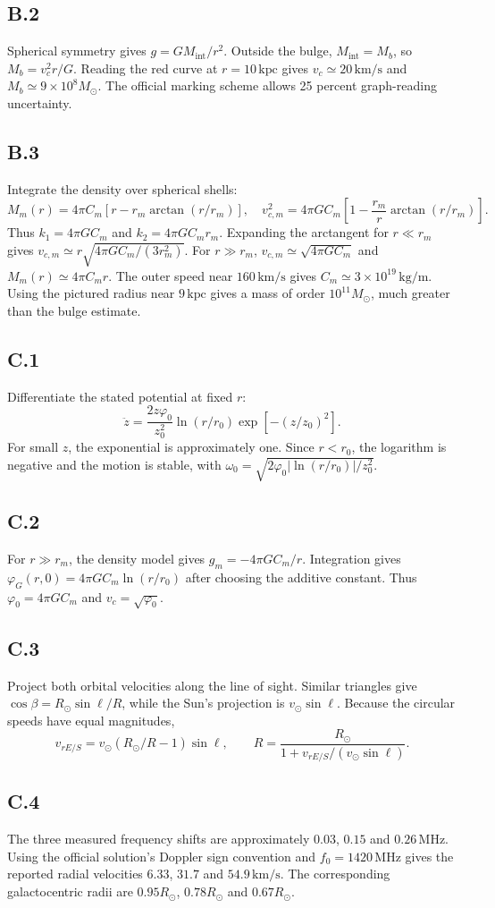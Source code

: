 \documentclass{article}
\begin{document}
\subsection*{B.2}
Spherical symmetry gives $g=GM_{\mathrm{int}}/r^2$. Outside the bulge, $M_{\mathrm{int}}=M_b$, so $M_b=v_c^2r/G$. Reading the red curve at $r=10\,\mathrm{kpc}$ gives $v_c\simeq20\,\mathrm{km/s}$ and $M_b\simeq9\times10^8M_\odot$. The official marking scheme allows 25 percent graph-reading uncertainty.
\subsection*{B.3}
Integrate the density over spherical shells:
\[M_m(r)=4\pi C_m\left[r-r_m\arctan(r/r_m)\right],\quad v_{c,m}^2=4\pi GC_m\left[1-\frac{r_m}{r}\arctan(r/r_m)\right].\]
Thus $k_1=4\pi GC_m$ and $k_2=4\pi GC_mr_m$. Expanding the arctangent for $r\ll r_m$ gives $v_{c,m}\simeq r\sqrt{4\pi GC_m/(3r_m^2)}$. For $r\gg r_m$, $v_{c,m}\simeq\sqrt{4\pi GC_m}$ and $M_m(r)\simeq4\pi C_mr$. The outer speed near $160\,\mathrm{km/s}$ gives $C_m\simeq3\times10^{19}\,\mathrm{kg/m}$. Using the pictured radius near $9\,\mathrm{kpc}$ gives a mass of order $10^{11}M_\odot$, much greater than the bulge estimate.
\subsection*{C.1}
Differentiate the stated potential at fixed $r$:
\[\ddot z=\frac{2z\varphi_0}{z_0^2}\ln(r/r_0)\exp[-(z/z_0)^2].\]
For small $z$, the exponential is approximately one. Since $r<r_0$, the logarithm is negative and the motion is stable, with $\omega_0=\sqrt{2\varphi_0|\ln(r/r_0)|/z_0^2}$.
\subsection*{C.2}
For $r\gg r_m$, the density model gives $g_m=-4\pi GC_m/r$. Integration gives $\varphi_G(r,0)=4\pi GC_m\ln(r/r_0)$ after choosing the additive constant. Thus $\varphi_0=4\pi GC_m$ and $v_c=\sqrt{\varphi_0}$.
\subsection*{C.3}
Project both orbital velocities along the line of sight. Similar triangles give $\cos\beta=R_\odot\sin\ell/R$, while the Sun's projection is $v_\odot\sin\ell$. Because the circular speeds have equal magnitudes,
\[v_{rE/S}=v_\odot(R_\odot/R-1)\sin\ell,\qquad R=\frac{R_\odot}{1+v_{rE/S}/(v_\odot\sin\ell)}.\]
\subsection*{C.4}
The three measured frequency shifts are approximately $0.03$, $0.15$ and $0.26\,\mathrm{MHz}$. Using the official solution's Doppler sign convention and $f_0=1420\,\mathrm{MHz}$ gives the reported radial velocities $6.33$, $31.7$ and $54.9\,\mathrm{km/s}$. The corresponding galactocentric radii are $0.95R_\odot$, $0.78R_\odot$ and $0.67R_\odot$.
\end{document}
